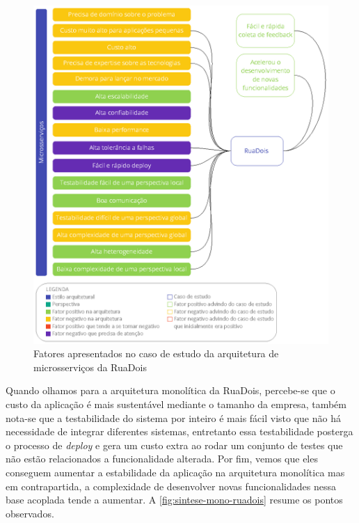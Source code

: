 \begin{figure}[h]
  \centering
  \includegraphics[keepaspectratio=true,scale=1]{figuras/analise-micro-ruadois.eps}
  \caption{Fatores apresentados no caso de estudo da arquitetura de microsserviços da RuaDois\label{fig:sintese-micro-ruadois}}
\end{figure}

Quando olhamos para a arquitetura monolítica da RuaDois, percebe-se que o custo da aplicação é mais
sustentável mediante o tamanho da empresa, também nota-se que a testabilidade do sistema por inteiro
é mais fácil visto que não há necessidade de integrar diferentes sistemas, entretanto essa testabilidade
posterga o processo de \textit{deploy} e gera um custo extra ao rodar um conjunto de testes que não estão
relacionados a funcionalidade alterada. Por fim, vemos que eles conseguem aumentar a estabilidade da
aplicação na arquitetura monolítica mas em contrapartida, a complexidade de desenvolver novas
funcionalidades nessa base acoplada tende a aumentar. A \autoref{fig:sintese-mono-ruadois} resume os
pontos observados.

